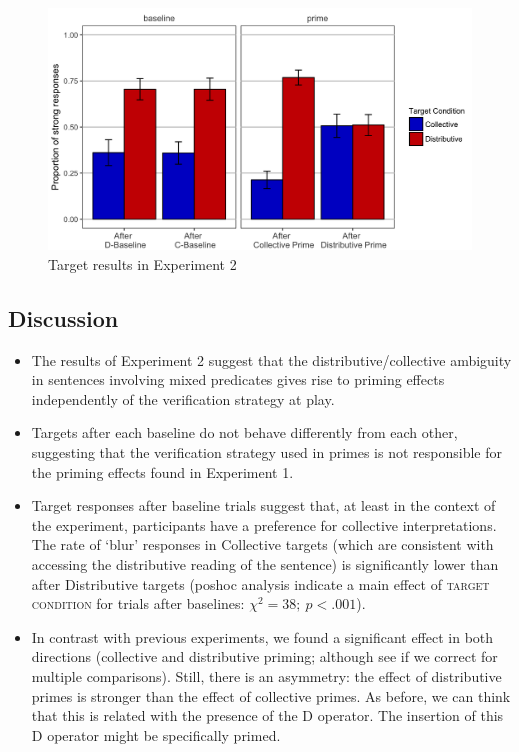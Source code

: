 \documentclass[a4paper, 11pt]{article}
\begin{document}
\begin{figure}[h!]
  \centering
    \includegraphics[width=.6\textwidth]{Targets-Experiment2.png}
         \caption{Target results in Experiment 2}
        \label{fig:targetresults.exp2}
    \end{figure}


\subsection{Discussion}

\begin{itemize}
\item The results of Experiment 2 suggest that the distributive/collective ambiguity in sentences involving mixed predicates gives rise to priming effects independently of the verification strategy at play. 

\item Targets after each baseline do not behave differently from each other, suggesting that the verification strategy used in primes is not responsible for the priming effects found in Experiment 1. 

\item Target responses after baseline trials suggest that, at least in the context of the experiment, participants have a preference for collective interpretations. The rate of `blur' responses in Collective targets (which are consistent with accessing the distributive reading of the sentence) is significantly lower than after Distributive targets (poshoc analysis indicate a main effect of \textsc{target condition} for trials after baselines: $\chi^{2} = 38; \ p<.001$). 

\item In contrast with previous experiments, we found a significant effect in both directions (collective and distributive priming; although see if we correct for multiple comparisons). Still, there is an asymmetry: the effect of distributive primes is stronger than the effect of collective primes. As before, we can think that this is related with the presence of the D operator. The insertion of this D operator might be specifically primed. 

\end{itemize}
\end{document}
